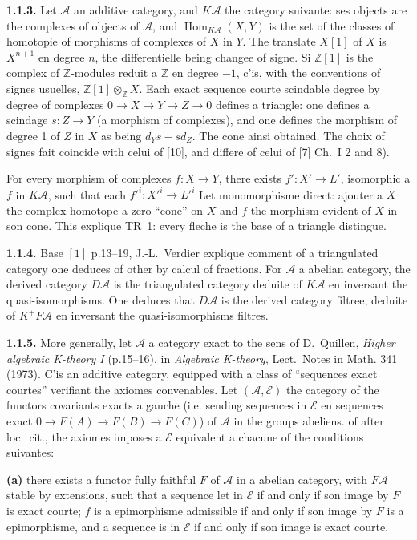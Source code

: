 \documentclass[12pt,a4paper]{article}
\theoremstyle{plain}
\theoremstyle{definition}
\theoremstyle{remark}
\DeclareMathOperator{\Hom}{Hom}
\newcommand{\ZZ}{\mathbb{Z}}
\newcommand{\cA}{\mathcal{A}}
\newcommand{\cE}{\mathcal{E}}
\begin{document}
\noindent
\textbf{1.1.3.} Let $\cA$ an additive category, and $K\cA$ the category suivante: ses objects are the complexes of objects of $\cA$, and $\Hom_{K\cA}(X, Y)$ is the set of the classes of homotopie of morphisms of complexes of $X$ in $Y$. The translate $X[1]$ of $X$ is $X^{n+1}$ en degree $n$, the differentielle being changee of signe. Si $\ZZ[1]$ is the complex of $\ZZ$-modules reduit a $\ZZ$ en degree $-1$, c'is, with the conventions of signes usuelles, $\ZZ[1] \otimes_{\ZZ} X$. Each exact sequence courte scindable degree by degree of complexes $0 \to X \to Y \to Z \to 0$ defines a triangle: one defines a scindage $s : Z \to Y$ (a morphism of complexes), and one defines the morphism of degree 1 of $Z$ in $X$ as being $d_{Y}s - sd_{Z}$. The cone ainsi obtained. The choix of signes fait coincide with celui of [10], and differe of celui of [7] Ch.~I 2 and 8).

For every morphism of complexes $f : X \to Y$, there exists $f' : X' \to L'$, isomorphic a $f$ in $K\cA$, such that each $f'^{i} : X'^{i} \to L'^{i}$ Let monomorphisme direct: ajouter a $X$ the complex homotope a zero ``cone'' on $X$ and $f$ the morphism evident of $X$ in son cone. This explique TR~1: every fleche is the base of a triangle distingue.

\medskip

\noindent
\textbf{1.1.4.} Base $[1]$ p.13--19, J.-L.~Verdier explique comment of a triangulated category one deduces of other by calcul of fractions. For $\cA$ a abelian category, the derived category $D\cA$ is the triangulated category deduite of $K\cA$ en inversant the quasi-isomorphisms. One deduces that $D\cA$ is the derived category filtree, deduite of $K^{+}F\cA$ en inversant the quasi-isomorphisms filtres.

\medskip

\noindent
\textbf{1.1.5.} More generally, let $\cA$ a category exact to the sens of D.~Quillen, \emph{Higher algebraic K-theory I} (p.15--16), in \emph{Algebraic K-theory}, Lect.~Notes in Math. 341 (1973). C'is an additive category, equipped with a class of ``sequences exact courtes'' verifiant the axiomes convenables. Let $(\cA, \cE)$ the category of the functors covariants exacts a gauche (i.e. sending sequences in $\cE$ en sequences exact $0 \to F(A) \to F(B) \to F(C)$) of $\cA$ in the groups abeliens. of after loc.~cit., the axiomes imposes a $\cE$ equivalent a chacune of the conditions suivantes:

\medskip

\noindent
\textbf{(a)} there exists a functor fully faithful $F$ of $\cA$ in a abelian category, with $F\cA$ stable by extensions, such that a sequence let in $\cE$ if and only if son image by $F$ is exact courte; $f$ is a epimorphisme admissible if and only if son image by $F$ is a epimorphisme, and a sequence is in $\cE$ if and only if son image is exact courte.
\end{document}
